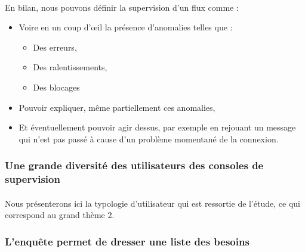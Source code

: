 			\paragraph{}
			En bilan, nous pouvons définir la supervision d'un flux comme :
			\begin{itemize}
			  \item Voire en un coup d’œil la présence d’anomalies telles que :
			  	\begin{itemize}
			  	  \item Des erreurs,
			  	  \item Des ralentissements,
			  	  \item Des blocages
		  	    \end{itemize}
			  \item Pouvoir expliquer, même partiellement ces anomalies,
			  \item Et éventuellement pouvoir agir dessus, par exemple en rejouant un
			  message qui n’est pas passé à cause d’un problème momentané de la connexion.
			\end{itemize}
			
		\subsubsection{Une grande diversité des utilisateurs des consoles de
		supervision}
			\paragraph{}%
			Nous présenterons ici la typologie d'utilisateur qui est ressortie de
			l'étude, ce qui correspond au grand thème 2.
			
			\paragraph{}%
			
		\subsubsection{L'enquête permet de dresser une liste des besoins}
			\paragraph{}%
			
			\paragraph{}%
			
